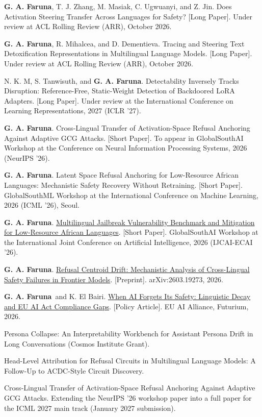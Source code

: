 \documentclass[11pt,letterpaper]{article}
\newlength{\cvindent}
\newcommand{\cvsection}[1]{%
  \par\addvspace{6.5pt}%
  \noindent\hspace*{-\cvindent}%
  \makebox[\cvindent][l]{\smash{\parbox[t]{\cvindent}{\raggedright\bfseries #1}}}%
  \ignorespaces}
\newcommand{\entrygap}{\par\vspace{3pt}}
\newcommand{\me}{\textbf{G. A. Faruna}}
\begin{document}
\cvsection{Publications}%
\me, T. J. Zhang, M. Masiak, C. Ugwuanyi, and Z. Jin. Does Activation Steering Transfer Across Languages for Safety? [Long Paper]. Under review at ACL Rolling Review (ARR), October 2026.
\entrygap
\me, R. Mihalcea, and D. Dementieva. Tracing and Steering Text Detoxification Representations in Multilingual Language Models. [Long Paper]. Under review at ACL Rolling Review (ARR), October 2026.
\entrygap
N. K. M, S. Tanwisuth, and \me. Detectability Inversely Tracks Disruption: Reference-Free, Static-Weight Detection of Backdoored LoRA Adapters. [Long Paper]. Under review at the International Conference on Learning Representations, 2027 (ICLR '27).
\entrygap
\me. Cross-Lingual Transfer of Activation-Space Refusal Anchoring Against Adaptive GCG Attacks. [Short Paper]. To appear in GlobalSouthAI Workshop at the Conference on Neural Information Processing Systems, 2026 (NeurIPS '26).
\entrygap
\me. Latent Space Refusal Anchoring for Low-Resource African Languages: Mechanistic Safety Recovery Without Retraining. [Short Paper]. GlobalSouthML Workshop at the International Conference on Machine Learning, 2026 (ICML '26), Seoul.
\entrygap
\me. \href{https://openreview.net/forum?id=xLH4pHwnTO}{Multilingual Jailbreak Vulnerability Benchmark and Mitigation for Low-Resource African Languages}. [Short Paper]. GlobalSouthAI Workshop at the International Joint Conference on Artificial Intelligence, 2026 (IJCAI-ECAI '26).
\entrygap
\me. \href{https://arxiv.org/abs/2603.19273}{Refusal Centroid Drift: Mechanistic Analysis of Cross-Lingual Safety Failures in Frontier Models}. [Preprint]. arXiv:2603.19273, 2026.
\entrygap
\me\ and K. El Bairi. \href{https://futurium.ec.europa.eu/en/apply-ai-alliance/community-content/when-ai-forgets-its-safety-linguistic-decay-and-eu-ai-act-compliance-gaps}{When AI Forgets Its Safety: Linguistic Decay and EU AI Act Compliance Gaps}. [Policy Article]. EU AI Alliance, Futurium, 2026.

\cvsection{On-Going\\Work}%
Persona Collapse: An Interpretability Workbench for Assistant Persona Drift in Long Conversations (Cosmos Institute Grant).
\entrygap
Head-Level Attribution for Refusal Circuits in Multilingual Language Models: A Follow-Up to ACDC-Style Circuit Discovery.
\entrygap
Cross-Lingual Transfer of Activation-Space Refusal Anchoring Against Adaptive GCG Attacks. Extending the NeurIPS '26 workshop paper into a full paper for the ICML 2027 main track (January 2027 submission).
\end{document}
